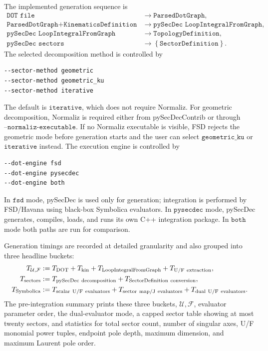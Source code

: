 \documentclass[11pt]{article}
\newcommand{\U}{\mathcal U}
\newcommand{\F}{\mathcal F}
\begin{document}
The implemented generation sequence is
\begin{align}
  \texttt{DOT file}
  &\longrightarrow
  \texttt{ParsedDotGraph},
  \\
  \texttt{ParsedDotGraph}+\texttt{KinematicsDefinition}
  &\longrightarrow
  \texttt{pySecDec LoopIntegralFromGraph},
  \\
  \texttt{pySecDec LoopIntegralFromGraph}
  &\longrightarrow
  \texttt{TopologyDefinition},
  \\
  \texttt{pySecDec sectors}
  &\longrightarrow
  \left\{\texttt{SectorDefinition}\right\}.
\end{align}
The selected decomposition method is controlled by
\begin{lstlisting}[style=fsdcode]
--sector-method geometric
--sector-method geometric_ku
--sector-method iterative
\end{lstlisting}
The default is \(\texttt{iterative}\), which does not require Normaliz.  For
geometric decomposition, Normaliz is required either from pySecDecContrib or
through \(\texttt{--normaliz-executable}\).  If no Normaliz executable is
visible, FSD rejects the geometric mode before generation starts and the user
can select \(\texttt{geometric\_ku}\) or \(\texttt{iterative}\) instead.
The execution engine is controlled by
\begin{lstlisting}[style=fsdcode]
--dot-engine fsd
--dot-engine pysecdec
--dot-engine both
\end{lstlisting}
In \(\texttt{fsd}\) mode,
pySecDec is used only for generation; integration is performed by FSD/Havana
using black-box Symbolica evaluators.  In \(\texttt{pysecdec}\) mode, pySecDec
generates, compiles, loads, and runs its own C++ integration package.  In
\(\texttt{both}\) mode both paths are run for comparison.

Generation timings are recorded at detailed granularity and also grouped into
three headline buckets:
\begin{align}
  T_{\U,\F}
  &:=
  T_{\rm DOT}
  +
  T_{\rm kin}
  +
  T_{\rm LoopIntegralFromGraph}
  +
  T_{\rm U/F\ extraction},
  \\
  T_{\rm sectors}
  &:=
  T_{\rm pySecDec\ decomposition}
  +
  T_{\rm SectorDefinition\ conversion},
  \\
  T_{\rm Symbolica}
  &:=
  T_{\rm scalar\ U/F\ evaluators}
  +
  T_{\rm sector\ map/J\ evaluators}
  +
  T_{\rm dual\ U/F\ evaluators}.
\end{align}
The pre-integration summary prints these three buckets, \(\U,\F\), evaluator
parameter order, the dual-evaluator mode, a capped sector table showing at
most twenty sectors, and statistics for total sector count, number of singular
axes, U/F monomial power tuples, endpoint pole depth, maximum dimension, and
maximum Laurent pole order.
\end{document}
